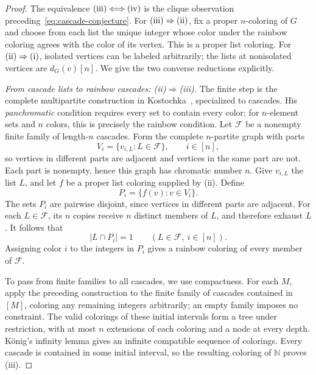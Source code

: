 \documentclass[11pt,reqno]{amsart}
\newcommand{\N}{\mathbb N}
\theoremstyle{definition}
\theoremstyle{remark}
\numberwithin{equation}{section}
\begin{document}
\begin{proof}
The equivalence $\textup{(iii)}\Longleftrightarrow\textup{(iv)}$
is the clique observation preceding~\eqref{eq:cascade-conjecture}.
For $\textup{(iii)}\Rightarrow\textup{(ii)}$, fix a proper
$n$-coloring of $G$ and choose from each list the unique integer
whose color under the rainbow coloring agrees with the color of its
vertex. This is a proper list coloring. For
$\textup{(ii)}\Rightarrow\textup{(i)}$,
isolated vertices can be labeled arbitrarily; the lists at nonisolated
vertices are $d_G(v)[n]$. We give the two converse reductions explicitly.

\emph{From cascade lists to rainbow cascades: \textup{(ii)}$\Rightarrow$\textup{(iii)}.}
The finite step is the complete multipartite construction in
Kostochka~\cite[proof of Theorem~2]{Kostochka}, specialized to cascades.
His \emph{panchromatic} condition requires every set to contain every
color; for $n$-element sets and $n$ colors, this is precisely the
rainbow condition.
Let $\mathcal F$ be a nonempty finite family of length-$n$ cascades.
Form the complete $n$-partite graph with parts
\[
 V_i=\{v_{i,L}:L\in\mathcal F\},\qquad i\in[n],
\]
so vertices in different parts are adjacent and vertices in the same
part are not. Each part is nonempty, hence this graph has chromatic
number $n$. Give $v_{i,L}$ the list $L$, and let $f$ be a proper list
coloring supplied by \textup{(ii)}. Define
\[
 P_i=\{f(v):v\in V_i\}.
\]
The sets $P_i$ are pairwise disjoint, since vertices in different
parts are adjacent. For each $L\in\mathcal F$, its $n$ copies receive
$n$ distinct members of $L$, and therefore exhaust $L$. It follows that
\[
 |L\cap P_i|=1\qquad(L\in\mathcal F,\ i\in[n]).
\]
Assigning color $i$ to the integers in $P_i$ gives a rainbow coloring
of every member of $\mathcal F$.

To pass from finite families to all cascades, we use compactness.
For each $M$, apply the preceding construction to the finite family of cascades
contained in $[M]$, coloring any remaining integers arbitrarily;
an empty family imposes no constraint.
The valid colorings of these initial intervals form a tree under
restriction, with at most $n$ extensions of each coloring and a node
at every depth. K\"onig's infinity lemma gives an infinite compatible
sequence of colorings. Every cascade is contained in some initial
interval, so the resulting coloring of $\N$ proves \textup{(iii)}.


\end{proof}
\end{document}

